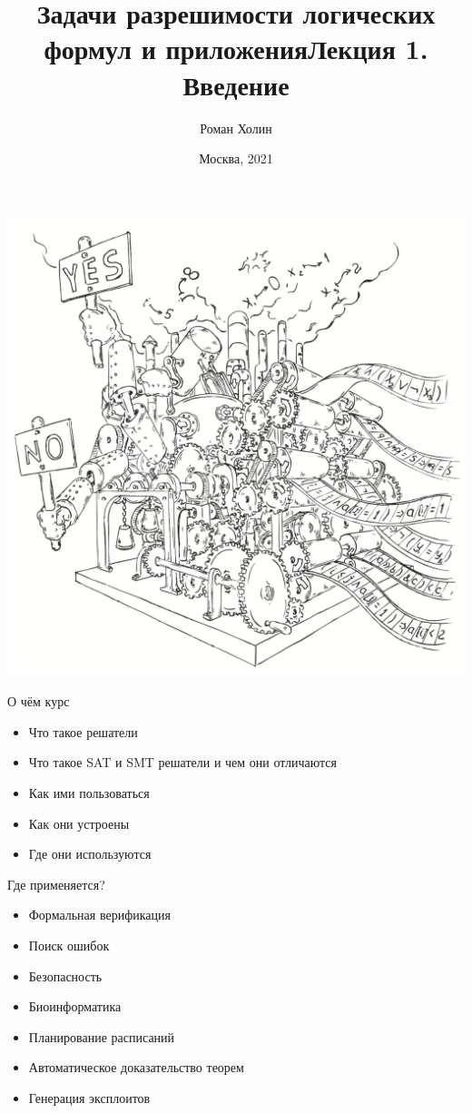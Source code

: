 \documentclass{beamer}
\begin{document}
\title{Задачи разрешимости логических формул и приложения\newline Лекция 1. Введение}
\author{Роман Холин}
\date{Москва, 2021}

\begin{frame}
\includegraphics[scale=0.5]{../decision-procedure.png}
\end{frame}

\frame{\titlepage}

\begin{frame}{О чём курс}
\begin{itemize}
\item Что такое решатели
\item Что такое SAT и SMT решатели и чем они отличаются
\item Как ими пользоваться
\item Как они устроены
\item Где они используются
\end{itemize}
\end{frame}

\begin{frame}{Где применяется?}
\begin{itemize}
\item Формальная верификация
\item Поиск ошибок
\item Безопасность
\item Биоинформатика
\item Планирование расписаний
\item Автоматическое доказательство теорем
\item Генерация эксплоитов
\end{itemize}
\end{frame}
\end{document}
